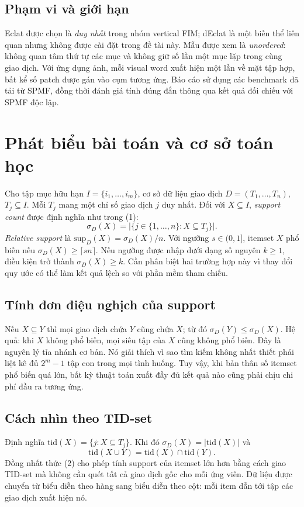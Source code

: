 \documentclass[conference,10pt]{IEEEtran}
\begin{document}
\subsection{Phạm vi và giới hạn}
Eclat được chọn là \emph{duy nhất} trong nhóm vertical FIM; dEclat là một biến thể liên quan nhưng không được cài đặt trong đề tài này. Mẫu được xem là \emph{unordered}: không quan tâm thứ tự các mục và không giữ số lần một mục lặp trong cùng giao dịch. Với ứng dụng ảnh, mỗi visual word xuất hiện một lần về mặt tập hợp, bất kể số patch được gán vào cụm tương ứng. Báo cáo sử dụng các benchmark đã tải từ SPMF, đồng thời đánh giá tính đúng đắn thông qua kết quả đối chiếu với SPMF độc lập.

\section{Phát biểu bài toán và cơ sở toán học}
Cho tập mục hữu hạn $I=\{i_1,\dots,i_m\}$, cơ sở dữ liệu giao dịch $D=(T_1,\dots,T_n)$, $T_j\subseteq I$. Mỗi $T_j$ mang một chỉ số giao dịch $j$ duy nhất. Đối với $X\subseteq I$, \emph{support count} được định nghĩa như trong (1):
\begin{equation}\label{eq:supportcount}
\sigma_D(X)=\big|\{j\in\{1,\dots,n\}:X\subseteq T_j\}\big|.
\end{equation}
\emph{Relative support} là $\mathrm{sup}_D(X)=\sigma_D(X)/n$. Với ngưỡng $s\in(0,1]$, itemset $X$ phổ biến nếu $\sigma_D(X)\ge\lceil sn\rceil$. Nếu ngưỡng được nhập dưới dạng số nguyên $k\ge1$, điều kiện trở thành $\sigma_D(X)\ge k$. Cần phân biệt hai trường hợp này vì thay đổi quy ước có thể làm kết quả lệch so với phần mềm tham chiếu.

\subsection{Tính đơn điệu nghịch của support}
Nếu $X\subseteq Y$ thì mọi giao dịch chứa $Y$ cũng chứa $X$; từ đó $\sigma_D(Y)\le\sigma_D(X)$. Hệ quả: khi $X$ không phổ biến, mọi siêu tập của $X$ cũng không phổ biến. Đây là nguyên lý tỉa nhánh cơ bản. Nó giải thích vì sao tìm kiếm không nhất thiết phải liệt kê đủ $2^{m}-1$ tập con trong mọi tình huống. Tuy vậy, khi bản thân số itemset phổ biến quá lớn, bất kỳ thuật toán xuất đầy đủ kết quả nào cũng phải chịu chi phí đầu ra tương ứng.

\subsection{Cách nhìn theo TID-set}
Định nghĩa $\mathrm{tid}(X)=\{j:X\subseteq T_j\}$. Khi đó $\sigma_D(X)=|\mathrm{tid}(X)|$ và
\begin{equation}\label{eq:tidintersection}
\mathrm{tid}(X\cup Y)=\mathrm{tid}(X)\cap\mathrm{tid}(Y).
\end{equation}
Đồng nhất thức (2) cho phép tính support của itemset lớn hơn bằng cách giao TID-set mà không cần quét tất cả giao dịch gốc cho mỗi ứng viên. Dữ liệu được chuyển từ biểu diễn theo hàng sang biểu diễn theo cột: mỗi item dẫn tới tập các giao dịch xuất hiện nó.
\end{document}
